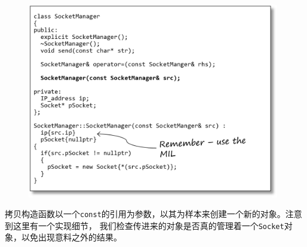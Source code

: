 \documentclass[12pt]{article}
\begin{document}
\begin{figure}[h]
\centering
\includegraphics[width=11cm]{./imgs/image.QMRNS0.png}
\end{figure}

\indent{}拷贝构造函数以一个\texttt{const}的引用为参数，以其为样本来创建一个新的对象。注意到这里有一个实现细节，
我们检查传进来的对象是否真的管理着一个\texttt{Socket}对象，以免出现意料之外的结果。
\end{document}
